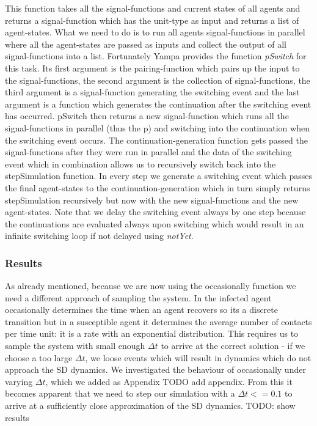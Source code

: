 This function takes all the signal-functions and current states of all agents and returns a signal-function which has the unit-type as input and returns a list of agent-states. What we need to do is to run all agents signal-functions in parallel where all the agent-states are passed as inputs and collect the output of all signal-functions into a list. Fortunately Yampa provides the function \textit{pSwitch} for this task. Its first argument is the pairing-function which pairs up the input to the signal-functions, the second argument is the collection of signal-functions, the third argument is a signal-function generating the switching event and the last argument is a function which generates the continuation after the switching event has occurred.
pSwitch then returns a new signal-function which runs all the signal-functions in parallel (thus the p) and switching into the continuation when the switching event occurs. The continuation-generation function gets passed the signal-functions after they were run in parallel and the data of the switching event which in combination allows us to recursively switch back into the stepSimulation function. In every step we generate a switching event which passes the final agent-states to the continuation-generation which in turn simply returns stepSimulation recursively but now with the new signal-functions and the new agent-states. Note that we delay the switching event always by one step because the continuations are evaluated always upon switching which would result in an infinite switching loop if not delayed using \textit{notYet}.

\subsubsection{Results}
As already mentioned, because we are now using the occasionally function we need a different approach of sampling the system. In the infected agent occasionally determines the time when an agent recovers so its a discrete transition but in a susceptible agent it determines the average number of contacts per time unit: it is a rate with an exponential distribution. This requires us to sample the system with small enough $\Delta t$ to arrive at the correct solution - if we choose a too large $\Delta t$, we loose events which will result in dynamics which do not approach the SD dynamics.
We investigated the behaviour of occasionally under varying $\Delta t$, which we added as Appendix TODO add appendix. From this it becomes apparent that we need to step our simulation with a $\Delta t <= 0.1$ to arrive at a sufficiently close approximation of the SD dynamics.
TODO: show results

